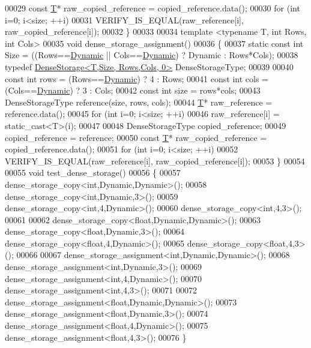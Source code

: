 \begin{DoxyCode}
00029   \textcolor{keyword}{const} \hyperlink{group___sparse_core___module}{T}* raw\_copied\_reference = copied\_reference.data();
00030   \textcolor{keywordflow}{for} (\textcolor{keywordtype}{int} i=0; i<size; ++i)
00031     VERIFY\_IS\_EQUAL(raw\_reference[i], raw\_copied\_reference[i]);
00032 \}
00033 
00034 \textcolor{keyword}{template} <\textcolor{keyword}{typename} T, \textcolor{keywordtype}{int} Rows, \textcolor{keywordtype}{int} Cols>
00035 \textcolor{keywordtype}{void} dense\_storage\_assignment()
00036 \{
00037   \textcolor{keyword}{static} \textcolor{keyword}{const} \textcolor{keywordtype}{int} Size = ((Rows==\hyperlink{namespace_eigen_ad81fa7195215a0ce30017dfac309f0b2}{Dynamic} || Cols==\hyperlink{namespace_eigen_ad81fa7195215a0ce30017dfac309f0b2}{Dynamic}) ? Dynamic : Rows*Cols);
00038   \textcolor{keyword}{typedef} \hyperlink{class_eigen_1_1_dense_storage}{DenseStorage<T,Size, Rows,Cols, 0>} DenseStorageType;
00039   
00040   \textcolor{keyword}{const} \textcolor{keywordtype}{int} rows = (Rows==\hyperlink{namespace_eigen_ad81fa7195215a0ce30017dfac309f0b2}{Dynamic}) ? 4 : Rows;
00041   \textcolor{keyword}{const} \textcolor{keywordtype}{int} cols = (Cols==\hyperlink{namespace_eigen_ad81fa7195215a0ce30017dfac309f0b2}{Dynamic}) ? 3 : Cols;
00042   \textcolor{keyword}{const} \textcolor{keywordtype}{int} size = rows*cols;
00043   DenseStorageType reference(size, rows, cols);
00044   \hyperlink{group___sparse_core___module}{T}* raw\_reference = reference.data();
00045   \textcolor{keywordflow}{for} (\textcolor{keywordtype}{int} i=0; i<size; ++i)
00046     raw\_reference[i] = static\_cast<T>(i);
00047     
00048   DenseStorageType copied\_reference;
00049   copied\_reference = reference;
00050   \textcolor{keyword}{const} \hyperlink{group___sparse_core___module}{T}* raw\_copied\_reference = copied\_reference.data();
00051   \textcolor{keywordflow}{for} (\textcolor{keywordtype}{int} i=0; i<size; ++i)
00052     VERIFY\_IS\_EQUAL(raw\_reference[i], raw\_copied\_reference[i]);
00053 \}
00054 
00055 \textcolor{keywordtype}{void} test\_dense\_storage()
00056 \{
00057   dense\_storage\_copy<int,Dynamic,Dynamic>();  
00058   dense\_storage\_copy<int,Dynamic,3>();
00059   dense\_storage\_copy<int,4,Dynamic>();
00060   dense\_storage\_copy<int,4,3>();
00061 
00062   dense\_storage\_copy<float,Dynamic,Dynamic>();
00063   dense\_storage\_copy<float,Dynamic,3>();
00064   dense\_storage\_copy<float,4,Dynamic>();  
00065   dense\_storage\_copy<float,4,3>();
00066   
00067   dense\_storage\_assignment<int,Dynamic,Dynamic>();  
00068   dense\_storage\_assignment<int,Dynamic,3>();
00069   dense\_storage\_assignment<int,4,Dynamic>();
00070   dense\_storage\_assignment<int,4,3>();
00071 
00072   dense\_storage\_assignment<float,Dynamic,Dynamic>();
00073   dense\_storage\_assignment<float,Dynamic,3>();
00074   dense\_storage\_assignment<float,4,Dynamic>();  
00075   dense\_storage\_assignment<float,4,3>();  
00076 \}
\end{DoxyCode}
